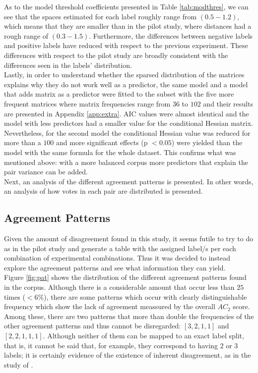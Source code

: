 As to the model threshold coefficients presented in Table \ref{tab:modthres}, we can see that the spaces estimated for each label roughly range from $(0.5-1.2)$, which means that they are smaller than in the pilot study, where distances had a rough range of $(0.3-1.5)$. Furthermore, the differences between negative labels and positive labels have reduced with respect to the previous experiment. These differences with respect to the pilot study are broadly consistent with the differences seen in the labels' distribution.\\

Lastly, in order to understand whether the sparsed distribution of the matrices explains why they do not work well as a predictor, the same model and a model that adds matrix as a predictor were fitted to the subset with the five more frequent matrices where matrix frequencies range from $36$ to $102$ and their results are presented in Appendix \ref{app:extra}. AIC values were almost identical and the model with less predictors had a smaller value for the conditional Hessian matrix. Nevertheless, for the second model the conditional Hessian value was reduced for more than a $100$ and more significant effects (p $<0.05$) were yielded than the model with the same formula for the whole dataset. This confirms what was mentioned above: with a more balanced corpus more predictors that explain the pair variance can be added.\\

Next, an analysis of the different agreement patterns is presented. In other words, an analysis of how votes in each pair are distributed is presented.\\

\subsection{Agreement Patterns}\label{subsect:agrepat}

Given the amount of disagreement found in this study, it seems futile to try to do as in the pilot study and generate a table with the assigned label/s per each combination of experimental combinations. Thus it was decided to instead explore the agreement patterns and see what information they can yield.\\

Figure \ref{fig:pat} shows the distribution of the different agreement patterns found in the corpus. Although there is a considerable amount that occur less than $25$ times ($<6\%$), there are some patterns which occur with clearly distinguishable frequency which show the lack of agreement meassured by the overall $AC_2$ score. Among these, there are two patterns that more than double the frequencies of the other agreement patterns and thus cannot be disregarded: $[3,2,1,1]$ and $[2,2,1,1,1]$. Although neither of them can be mapped to an exact label split, that is, it cannot be said that, for example, they correspond to having $2$ or $3$ labels; it is certainly evidence of the existence of inherent disagreement, as in the study of \citet{pavlick2019inherent}.\\

